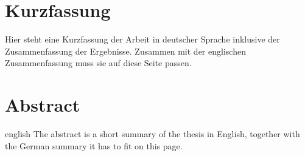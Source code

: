 \thispagestyle{plain}

\section*{Kurzfassung}
Hier steht eine Kurzfassung der Arbeit in deutscher Sprache inklusive der Zusammenfassung der
Ergebnisse.
Zusammen mit der englischen Zusammenfassung muss sie auf diese Seite passen.

\section*{Abstract}
\begin{foreignlanguage}{english}
The abstract is a short summary of the thesis in English, together with the German summary it has to fit on this page.
\end{foreignlanguage}